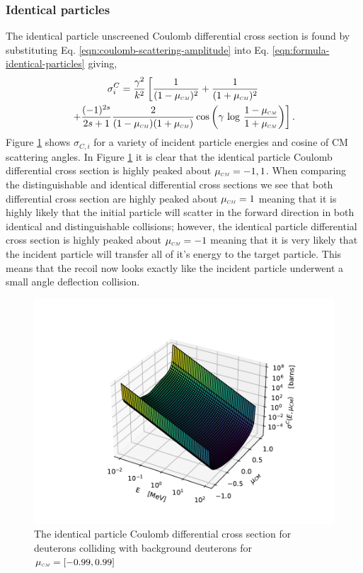 \subsubsection{Identical particles}
The identical particle unscreened Coulomb differential cross section is found by substituting Eq. \eqref{eqn:coulomb-scattering-amplitude} into Eq. \eqref{eqn:formula-identical-particles} giving,
\begin{multline} \label{eqn:coulomb-unscreened-identical}
   \sigma_{i}^{C} = \dfrac{\gamma^2}{k^2} \left[ \dfrac{1}{(1 - \mucm)^2} + \dfrac{1}{(1 + \mucm)^2} \right. \\ \left. + \dfrac{(-1)^{2s}}{2s+1} \dfrac{2}{(1 - \mucm)(1 + \mucm)} \cos \left( \gamma \, \log \, \dfrac{1 - \mucm}{1 + \mucm} \right) \right].
\end{multline}
Figure \ref{fig:coulomb-identical} shows $\sigma_{C,i}$ for a variety of incident particle energies and cosine of CM scattering angles. In Figure \ref{fig:coulomb-identical} it is clear that the identical particle Coulomb differential cross section is highly peaked about $\mucm = -1, 1$. When comparing the distinguishable and identical differential cross sections we see that both differential cross section are highly peaked about $\mucm = 1$ meaning that it is highly likely that the initial particle will scatter in the forward direction in both identical and distinguishable collisions; however, the identical particle differential cross section is highly peaked about $\mucm = -1$ meaning that it is very likely that the incident particle will transfer all of it's energy to the target particle. This means that the recoil now looks exactly like the incident particle underwent a small angle deflection collision.
\begin{figure}[!htb]
    \centering
    \includegraphics[scale=1.00]{../figures/interaction_physics/sigma-Ci.pdf}
    \caption{The identical particle Coulomb differential cross section for deuterons colliding with background deuterons for $\mucm = [-0.99,0.99]$}
    \label{fig:coulomb-identical}
\end{figure}

